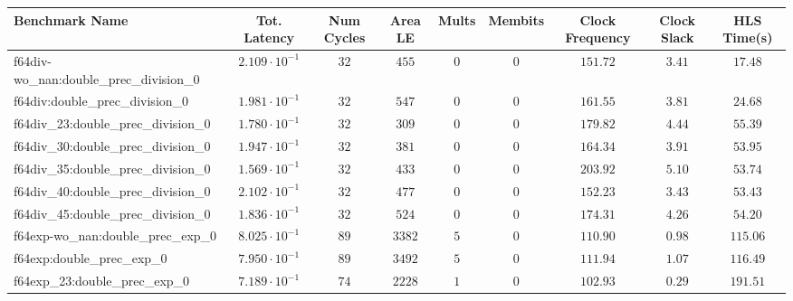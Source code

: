 \begin{tabular}{|l|c|c|c|c|c|c|c|c|}
\hline
Benchmark Name                                 & Tot. Latency            & Num Cycles & Area LE   & Mults   & Membits    & Clock Frequency & Clock Slack & HLS Time(s) \\
\hline
f64div-wo\_nan:double\_prec\_division\_0       & $ 2.109 \cdot 10^{-1} $ & $ 32     $ & $ 455   $ & $ 0   $ & $ 0      $ & $ 151.72      $ & $ 3.41    $ & $ 17.48   $ \\
f64div:double\_prec\_division\_0               & $ 1.981 \cdot 10^{-1} $ & $ 32     $ & $ 547   $ & $ 0   $ & $ 0      $ & $ 161.55      $ & $ 3.81    $ & $ 24.68   $ \\
f64div\_23:double\_prec\_division\_0           & $ 1.780 \cdot 10^{-1} $ & $ 32     $ & $ 309   $ & $ 0   $ & $ 0      $ & $ 179.82      $ & $ 4.44    $ & $ 55.39   $ \\
f64div\_30:double\_prec\_division\_0           & $ 1.947 \cdot 10^{-1} $ & $ 32     $ & $ 381   $ & $ 0   $ & $ 0      $ & $ 164.34      $ & $ 3.91    $ & $ 53.95   $ \\
f64div\_35:double\_prec\_division\_0           & $ 1.569 \cdot 10^{-1} $ & $ 32     $ & $ 433   $ & $ 0   $ & $ 0      $ & $ 203.92      $ & $ 5.10    $ & $ 53.74   $ \\
f64div\_40:double\_prec\_division\_0           & $ 2.102 \cdot 10^{-1} $ & $ 32     $ & $ 477   $ & $ 0   $ & $ 0      $ & $ 152.23      $ & $ 3.43    $ & $ 53.43   $ \\
f64div\_45:double\_prec\_division\_0           & $ 1.836 \cdot 10^{-1} $ & $ 32     $ & $ 524   $ & $ 0   $ & $ 0      $ & $ 174.31      $ & $ 4.26    $ & $ 54.20   $ \\
f64exp-wo\_nan:double\_prec\_exp\_0            & $ 8.025 \cdot 10^{-1} $ & $ 89     $ & $ 3382  $ & $ 5   $ & $ 0      $ & $ 110.90      $ & $ 0.98    $ & $ 115.06  $ \\
f64exp:double\_prec\_exp\_0                    & $ 7.950 \cdot 10^{-1} $ & $ 89     $ & $ 3492  $ & $ 5   $ & $ 0      $ & $ 111.94      $ & $ 1.07    $ & $ 116.49  $ \\
f64exp\_23:double\_prec\_exp\_0                & $ 7.189 \cdot 10^{-1} $ & $ 74     $ & $ 2228  $ & $ 1   $ & $ 0      $ & $ 102.93      $ & $ 0.29    $ & $ 191.51  $ \\

\end{tabular}
